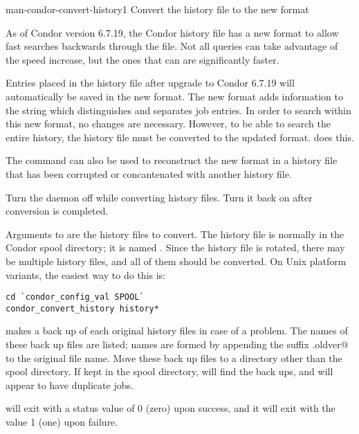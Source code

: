 \begin{ManPage}{}{man-condor-convert-history}{1}
{Convert the history file to the new format}
\Synopsis 




\Description

As of Condor version 6.7.19,
the Condor history file has a
new format to allow fast searches backwards through the file.
Not all queries can take advantage of the speed increase,
but the ones that can are significantly faster. 

Entries placed in the history file after upgrade
to Condor 6.7.19 will automatically be saved
in the new format.
The new format adds information to the string which
distinguishes and separates job entries.
In order to search within this new format,
no changes are necessary. 
However, to be able to search the entire history,
the history file must be converted to the updated format.
 does this.

The  command can also be used to reconstruct the
new format in a history file that has been corrupted or concantenated with
another history file.

Turn the  daemon off while converting 
history files.
Turn it back on after conversion is completed.

Arguments to  are the
history files to convert.
The history file is normally in the Condor spool directory;
it is named .
Since the history file is rotated,
there may be multiple history files, and all of them should be
converted. On Unix platform variants, the easiest way to do this is:

\begin{verbatim}
cd `condor_config_val SPOOL`
condor_convert_history history*
\end{verbatim}

 makes a
back up of each original history files in case of a problem.
The names of these back up files are listed;
names are formed by appending the suffix \verb@.oldver@
to the original file name.
Move these back up files to a directory other than
the spool directory.
If kept in the spool directory,
 will find the back ups,
and will appear to have duplicate jobs. 

\ExitStatus

 will exit with a status value of 0 (zero)
upon success, and it will exit with the value 1 (one) upon failure.

\end{ManPage}
